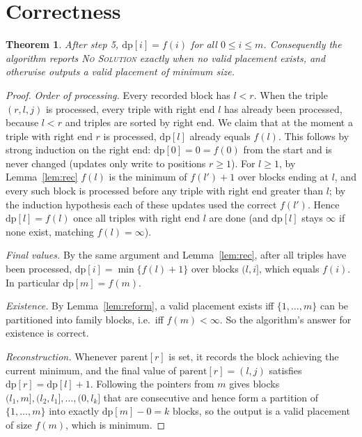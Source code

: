 \documentclass[11pt,a4paper]{article}
\newtheorem{theorem}{Theorem}
\theoremstyle{definition}
\begin{document}
\section{Correctness}

\begin{theorem}
After step 5, $\mathrm{dp}[i]=f(i)$ for all $0\le i\le m$. Consequently the algorithm reports \textsc{No Solution} exactly when no valid placement exists, and otherwise outputs a valid placement of minimum size.
\end{theorem}

\begin{proof}
\emph{Order of processing.} Every recorded block has $l<r$. When the triple $(r,l,j)$ is processed, every triple with right end $l$ has already been processed, because $l<r$ and triples are sorted by right end.
We claim that at the moment a triple with right end $r$ is processed, $\mathrm{dp}[l]$ already equals $f(l)$.
This follows by strong induction on the right end: $\mathrm{dp}[0]=0=f(0)$ from the start and is never changed (updates only write to positions $r\ge1$).
For $l\ge1$, by Lemma~\ref{lem:rec} $f(l)$ is the minimum of $f(l')+1$ over blocks ending at $l$, and every such block is processed before any triple with right end greater than $l$; by the induction hypothesis each of these updates used the correct $f(l')$. Hence $\mathrm{dp}[l]=f(l)$ once all triples with right end $l$ are done (and $\mathrm{dp}[l]$ stays $\infty$ if none exist, matching $f(l)=\infty$).

\emph{Final values.} By the same argument and Lemma~\ref{lem:rec}, after all triples have been processed, $\mathrm{dp}[i]=\min\{f(l)+1\}$ over blocks $(l,i]$, which equals $f(i)$. In particular $\mathrm{dp}[m]=f(m)$.

\emph{Existence.} By Lemma~\ref{lem:reform}, a valid placement exists iff $\{1,\dots,m\}$ can be partitioned into family blocks, i.e.\ iff $f(m)<\infty$. So the algorithm's answer for existence is correct.

\emph{Reconstruction.} Whenever $\mathrm{parent}[r]$ is set, it records the block achieving the current minimum, and the final value of $\mathrm{parent}[r]=(l,j)$ satisfies $\mathrm{dp}[r]=\mathrm{dp}[l]+1$.
Following the pointers from $m$ gives blocks $(l_1,m],(l_2,l_1],\dots,(0,l_k]$ that are consecutive and hence form a partition of $\{1,\dots,m\}$ into exactly $\mathrm{dp}[m]-0=k$ blocks, so the output is a valid placement of size $f(m)$, which is minimum.
\end{proof}
\end{document}
